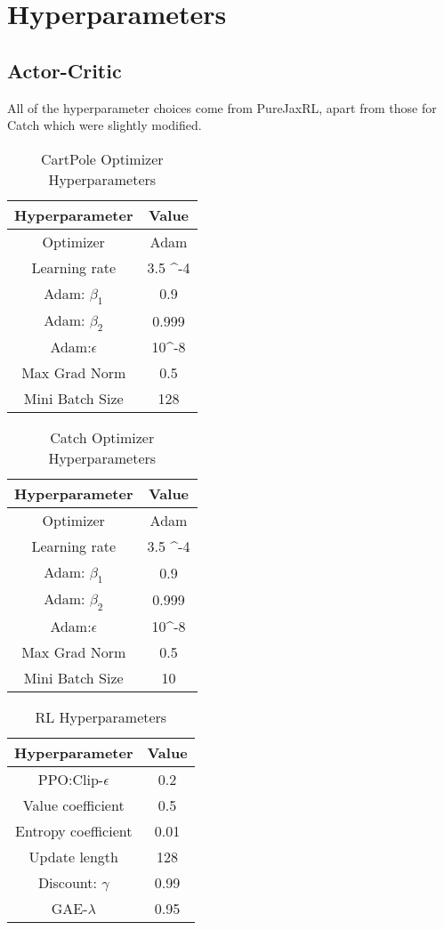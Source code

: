 \section{Hyperparameters}\label{ap:hyp}
\subsection{Actor-Critic}
All of the hyperparameter choices come from PureJaxRL\cite{alet2021noether}, apart from those for Catch which were slightly modified.
\begin{table}[h!]\label{tab:hyp_ac_cp}
	\centering
	\begin{tabular}{|c|c|}
		\hline
		Hyperparameter  & Value             \\
		\hline
		Optimizer       & Adam              \\
		Learning rate   & 3.5\cdot 10 ^{-4} \\
		Adam: $\beta_1$ & 0.9               \\
		Adam: $\beta_2$ & 0.999             \\
		Adam:$\epsilon$ & 10^{-8}           \\
		Max Grad Norm   & 0.5               \\
		Mini Batch Size & 128               \\
		\hline
	\end{tabular}
	\caption{CartPole Optimizer Hyperparameters}
\end{table}
\begin{table}[h!]\label{tab:hyp_ac_catch}
	\centering
	\begin{tabular}{|c|c|}
		\hline
		Hyperparameter  & Value             \\
		\hline
		Optimizer       & Adam              \\
		Learning rate   & 3.5\cdot 10 ^{-4} \\
		Adam: $\beta_1$ & 0.9               \\
		Adam: $\beta_2$ & 0.999             \\
		Adam:$\epsilon$ & 10^{-8}           \\
		Max Grad Norm   & 0.5               \\
		Mini Batch Size & 10                \\
		\hline
	\end{tabular}
	\caption{Catch Optimizer Hyperparameters}
\end{table}

\begin{table}[h!]\label{tab:hyp_rl}
	\centering
	\begin{tabular}{|c|c|}
		\hline
		Hyperparameter      & Value \\
		\hline
		PPO:Clip-$\epsilon$ & 0.2   \\
		Value coefficient   & 0.5   \\
		Entropy coefficient & 0.01  \\
		Update length       & 128   \\
		Discount: $\gamma$  & 0.99  \\
		GAE-$\lambda$       & 0.95  \\
		\hline
	\end{tabular}
	\caption{RL Hyperparameters}
\end{table}

